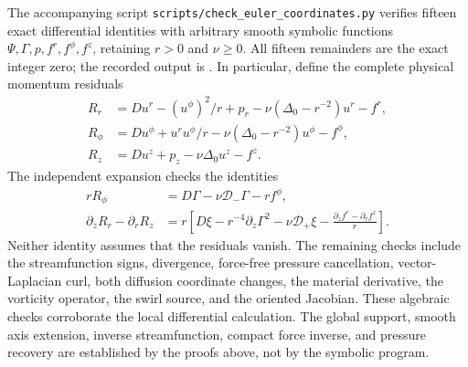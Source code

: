 The accompanying script
\texttt{scripts/check\_euler\_coordinates.py} verifies fifteen exact
differential identities with arbitrary smooth symbolic functions
\(\Psi,\Gamma,p,f^r,f^\phi,f^z\), retaining \(r>0\) and
\(\nu\geq0\).  All fifteen remainders are the exact integer zero;
the recorded output is
.
In particular, define the complete physical momentum residuals
\begin{align*}
 R_r&=Du^r-(u^\phi)^2/r+p_r
            -\nu(\Delta_0-r^{-2})u^r-f^r,\\
 R_\phi&=Du^\phi+u^ru^\phi/r
            -\nu(\Delta_0-r^{-2})u^\phi-f^\phi,\\
 R_z&=Du^z+p_z-\nu\Delta_0u^z-f^z.
\end{align*}
The independent expansion checks the identities
\begin{align}
 rR_\phi&=D\Gamma-\nu\mathcal D_-\Gamma-rf^\phi,
 \label{eq:ec-symbolic-swirl}\\
 \partial_zR_r-\partial_rR_z
 &=r\left[D\xi-r^{-4}\partial_z\Gamma^2-\nu\mathcal D_+\xi
               -\frac{\partial_zf^r-\partial_rf^z}{r}\right].
 \label{eq:ec-symbolic-curl}
\end{align}
Neither identity assumes that the residuals vanish.  The remaining
checks include the streamfunction signs, divergence, force-free
pressure cancellation, vector-Laplacian curl, both diffusion
coordinate changes, the material derivative, the vorticity operator,
the swirl source, and the oriented Jacobian.  These algebraic checks
corroborate the local differential calculation.  The global support,
smooth axis extension, inverse streamfunction, compact force inverse,
and pressure recovery are established by the proofs above, not by the
symbolic program.
